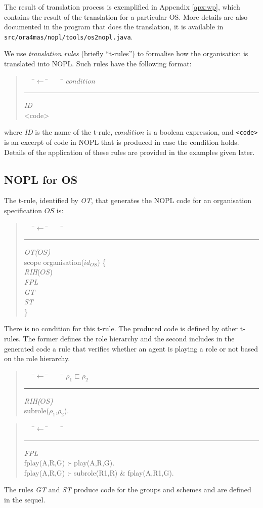 \documentclass{article}
\newcommand{\subrole}{\sqsubset}
\newcommand{\code}[1]{\texttt{#1}}
\newenvironment{rwrule}[2]
{\begin{quote}\ttfamily\begin{tabbing}~~~\=$\leftarrow$ \= ~~~ \= \kill
     \ensuremath{#2}\\
     \rule[2pt]{6.5cm}{.3pt} \hfill \rwlabel{#1}\\}
{\end{tabbing}\end{quote}}
\newcommand{\rwlabel}[1]{{\scshape\itshape\textrm{#1}}}
\theoremstyle{definition} \newtheorem{definition}{Definition}
\begin{document}
The result of translation process is exemplified in Appendix
\ref{apx:wp}, which contains the result of the translation for a
particular OS. More details are also documented in the program that
does the translation, it is available in
\code{src/ora4mas/nopl/tools/os2nopl.java}.

\bigskip

We use \emph{translation rules} (briefly ``t-rules'') to formalise how
the organisation is translated into NOPL. Such rules have the
following format:

\begin{rwrule}{ID}
{condition}
<code>
\end{rwrule}
where \rwlabel{ID} is the name of the t-rule, $condition$ is
a boolean expression, and \code{<code>} is an excerpt of code in NOPL
that is produced in case the condition holds. Details of the
application of these rules are provided in the examples given later.

\subsection{NOPL for OS}

The t-rule, identified by \rwlabel{OT}, that generates the NOPL code
for an organisation specification $OS$ is:
\begin{rwrule}{OT($OS$)}
{ }
scope organisation($id_{OS}$) \{ \\
   \> \rwlabel{RIH}($OS$)\\
   \> \rwlabel{FPL}\\
   \>  \rwlabel{GT}\\
   \>  \rwlabel{ST}\\
\}
\end{rwrule}
There is no condition for this t-rule. The produced code is defined by
other t-rules. The former defines the role hierarchy and the second
includes in the generated code a rule that verifies whether an agent
is playing a role or not based on the role hierarchy.
\begin{rwrule}{RIH($OS$)}
{ \rho_1 \subrole \rho_2 }
subrole($\rho_1$,$\rho_2$).
\end{rwrule}

\begin{rwrule}{FPL}
{ }
fplay(A,R,G) :- play(A,R,G).\\
fplay(A,R,G) :- subrole(R1,R) \& fplay(A,R1,G).
\end{rwrule}

The rules \rwlabel{GT} and \rwlabel{ST} produce code for the groups
and schemes and are defined in the sequel.
\end{document}
